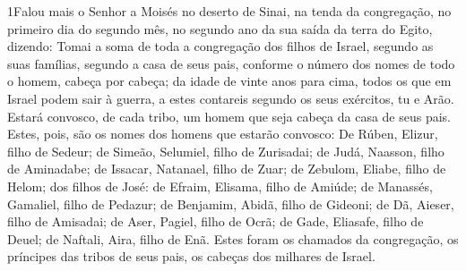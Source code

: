 
\lettrine{1} Falou mais o Senhor a Moisés no deserto de Sinai,
na tenda da congregação, no primeiro dia do segundo mês, no segundo
ano da sua saída da terra do Egito, dizendo: Tomai a soma de
toda a congregação dos filhos de Israel, segundo as suas famílias,
segundo a casa de seus pais, conforme o número dos nomes de todo o
homem, cabeça por cabeça; da idade de vinte anos para cima,
todos os que em Israel podem sair à guerra, a estes contareis
segundo os seus exércitos, tu e Arão. Estará convosco, de cada
tribo, um homem que seja cabeça da casa de seus pais. Estes,
pois, são os nomes dos homens que estarão convosco: De Rúben,
Elizur, filho de Sedeur; de Simeão, Selumiel, filho de
Zurisadai; de Judá, Naasson, filho de Aminadabe; de Issacar,
Natanael, filho de Zuar; de Zebulom, Eliabe, filho de Helom;
dos filhos de José: de Efraim, Elisama, filho de Amiúde; de
Manassés, Gamaliel, filho de Pedazur; de Benjamim, Abidã,
filho de Gideoni; de Dã, Aieser, filho de Amisadai; de
Aser, Pagiel, filho de Ocrã; de Gade, Eliasafe, filho de
Deuel; de Naftali, Aira, filho de Enã. Estes foram os
chamados da congregação, os príncipes das tribos de seus pais, os
cabeças dos milhares de Israel.

